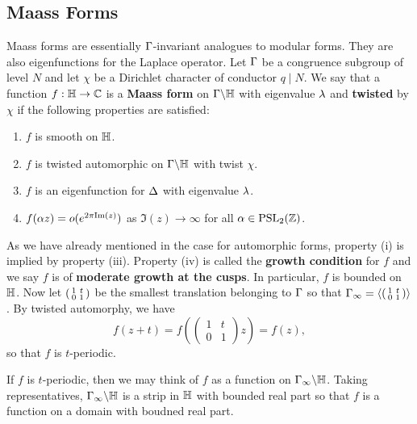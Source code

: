     \subsection*{Maass Forms}
      Maass forms are essentially $\Gamma$-invariant analogues to modular forms. They are also eigenfunctions for the Laplace operator. Let $\Gamma$ be a congruence subgroup of level $N$ and let $\chi$ be a Dirichlet character of conductor $q \mid N$. We say that a function $f:\mathbb{H} \to \mathbb{C}$ is a \textbf{Maass form} on $\Gamma\backslash\mathbb{H}$ with eigenvalue $\lambda$ and \textbf{twisted} by $\chi$ if the following properties are satisfied:
      \begin{enumerate}[label=(\roman*)]
        \item $f$ is smooth on $\mathbb{H}$.
        \item $f$ is twisted automorphic on $\Gamma\backslash\mathbb{H}$ with twist $\chi$.
        \item $f$ is an eigenfunction for $\Delta$ with eigenvalue $\lambda$.
        \item $f(\alpha z) = o(e^{2\pi\mathrm{Im}(z)})$ as $\Im(z) \to \infty$ for all $\alpha \in \mathrm{PSL}_{2}(\mathbb{Z})$.
      \end{enumerate}
      As we have already mentioned in the case for automorphic forms, property (i) is implied by property (iii). Property (iv) is called the \textbf{growth condition} for $f$ and we say $f$ is of \textbf{moderate growth at the cusps}. In particular, $f$ is bounded on $\mathbb{H}$. Now let $\begin{psmallmatrix} 1 & t \\ 0 & 1 \end{psmallmatrix}$ be the smallest translation belonging to $\Gamma$ so that $\Gamma_{\infty} = \left\langle\begin{psmallmatrix} 1 & t \\ 0 & 1 \end{psmallmatrix}\right\rangle$. By twisted automorphy, we have
      \[
        f(z+t) = f\left(\begin{pmatrix} 1 & t \\ 0 & 1 \end{pmatrix}z\right) = f(z),
      \]
      so that $f$ is $t$-periodic.

      \begin{remark}
        If $f$ is $t$-periodic, then we may think of $f$ as a function on $\Gamma_{\infty}\backslash\mathbb{H}$. Taking representatives, $\Gamma_{\infty}\backslash\mathbb{H}$ is a strip in $\mathbb{H}$ with bounded real part so that $f$ is a function on a domain with boudned real part.
      \end{remark}

